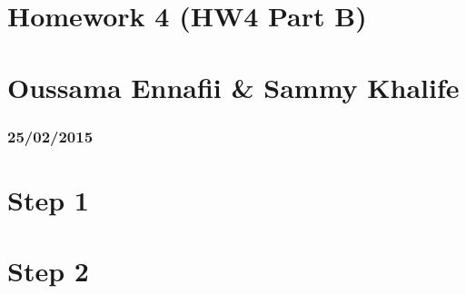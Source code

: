 


\geometry{hmargin=2.5cm,vmargin=2cm}   

	
	\section*{Homework 4 (HW4 Part B)}
	\section*{Oussama Ennafii \& Sammy Khalife}
	\subsubsection*{25/02/2015}
	
\section*{Step 1}
\section*{Step 2}	
